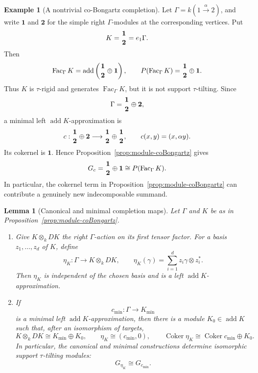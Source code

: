\documentclass[11pt,reqno]{amsart}
\newtheorem{lemma}[theorem]{Lemma}
\theoremstyle{definition}
\newtheorem{example}[theorem]{Example}
\theoremstyle{remark}
\newcommand{\Fac}{\operatorname{Fac}}
\newcommand{\addc}{\operatorname{add}}
\newcommand{\Coker}{\operatorname{Coker}}
\numberwithin{equation}{section}
\begin{document}
\begin{example}[A nontrivial co-Bongartz completion]
\label{ex:completion-term}
Let $\Gamma=k(1\xrightarrow{\alpha}2)$, and write $\mathbf 1$ and
$\mathbf 2$ for the simple right $\Gamma$-modules at the corresponding
vertices.  Put
\[
 K=\genfrac{}{}{0pt}{}{\mathbf 1}{\mathbf 2}=e_1\Gamma.
\]
Then
\[
 \Fac_\Gamma K
 =\addc\left(
   \genfrac{}{}{0pt}{}{\mathbf 1}{\mathbf 2}\oplus\mathbf 1\right),
 \qquad
 P(\Fac_\Gamma K)
 =\genfrac{}{}{0pt}{}{\mathbf 1}{\mathbf 2}\oplus\mathbf 1.
\]
Thus $K$ is $\tau$-rigid and generates $\Fac_\Gamma K$, but it is not
support $\tau$-tilting.  Since
\[
 \Gamma=\genfrac{}{}{0pt}{}{\mathbf 1}{\mathbf 2}\oplus\mathbf 2,
\]
a minimal left $\addc K$-approximation is
\[
 c:
 \genfrac{}{}{0pt}{}{\mathbf 1}{\mathbf 2}\oplus\mathbf 2
 \longrightarrow
 \genfrac{}{}{0pt}{}{\mathbf 1}{\mathbf 2}
 \oplus
 \genfrac{}{}{0pt}{}{\mathbf 1}{\mathbf 2},
 \qquad
 c(x,y)=(x,\alpha y).
\]
Its cokernel is $\mathbf 1$.  Hence Proposition~\ref{prop:module-coBongartz}
gives
\[
 G_c=\genfrac{}{}{0pt}{}{\mathbf 1}{\mathbf 2}\oplus\mathbf 1
 \cong P(\Fac_\Gamma K).
\]
In particular, the cokernel term in
Proposition~\ref{prop:module-coBongartz} can contribute a genuinely new
indecomposable summand.
\end{example}

\iffalse

\begin{lemma}[Canonical and minimal completion maps]
\label{lem:canonical-completion-map}
Let $\Gamma$ and $K$ be as in
Proposition~\ref{prop:module-coBongartz}.
\begin{enumerate}[label=\textup{(\arabic*)},leftmargin=2.2em]
 \item Give $K\otimes_kDK$ the right $\Gamma$-action on its first tensor
 factor.  For a basis $z_1,\ldots,z_d$ of $K$, define
 \begin{equation}\label{eq:universal-eta}
  \eta_K:\Gamma\longrightarrow K\otimes_kDK,
  \qquad
  \eta_K(\gamma)=\sum_{i=1}^d z_i\gamma\otimes z_i^*.
 \end{equation}
 Then $\eta_K$ is independent of the chosen basis and is a left
 $\addc K$-approximation.

 \item If
 \[
  c_{\min}:\Gamma\longrightarrow K_{\min}
 \]
 is a minimal left $\addc K$-approximation, then there is a module
 $K_0\in\addc K$ such that, after an isomorphism of targets,
 \begin{equation}\label{eq:canonical-minimal-comparison}
  K\otimes_kDK\cong K_{\min}\oplus K_0,
  \qquad
  \eta_K\cong(c_{\min},0),
  \qquad
  \Coker\eta_K\cong\Coker c_{\min}\oplus K_0.
 \end{equation}
 In particular, the canonical and minimal constructions determine
 isomorphic support $\tau$-tilting modules:
 \begin{equation}\label{eq:canonical-minimal-completion}
  G_{\eta_K}\cong G_{c_{\min}}.
 \end{equation}
\end{enumerate}
\end{lemma}
\end{document}

